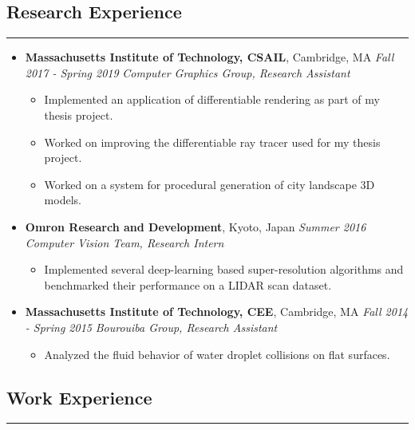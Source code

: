 \documentclass[10pt]{article}
\begin{document}
\subsection*{Research Experience}
\vspace*{-\baselineskip}
\noindent\rule{\linewidth}{0.4pt}

\begin{itemize}
    \item
        \textbf{Massachusetts Institute of Technology, CSAIL}, Cambridge, MA \hfill \emph{Fall 2017 - Spring 2019} \linebreak
        \emph{Computer Graphics Group, Research Assistant}
        \begin{itemize}
            \item Implemented an application of differentiable rendering as part of my thesis project.
            \item Worked on improving the differentiable ray tracer used for my thesis project.
            \item Worked on a system for procedural generation of city landscape 3D models.
        \end{itemize}
    \item
        \textbf{Omron Research and Development}, Kyoto, Japan \hfill \emph{Summer 2016} \linebreak
        \emph{Computer Vision Team, Research Intern}
        \begin{itemize}
            \item Implemented several deep-learning based super-resolution algorithms and benchmarked their performance on a LIDAR scan dataset.
        \end{itemize}
    \item
        \textbf{Massachusetts Institute of Technology, CEE}, Cambridge, MA \hfill \emph{Fall 2014 - Spring 2015} \linebreak
        \emph{Bourouiba Group, Research Assistant}
        \begin{itemize}
            \item Analyzed the fluid behavior of water droplet collisions on flat surfaces.
        \end{itemize}
\end{itemize}

\subsection*{Work Experience}
\vspace*{-\baselineskip}
\noindent\rule{\linewidth}{0.4pt}
\end{document}
